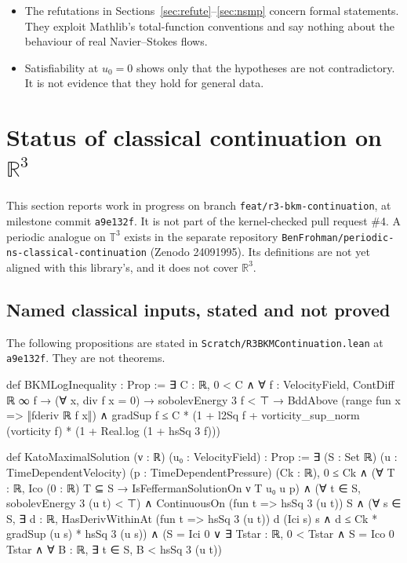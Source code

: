 \documentclass[11pt,a4paper]{article}
\theoremstyle{definition}
\theoremstyle{remark}
\newcommand{\R}{\mathbb{R}}
\newcommand{\T}{\mathbb{T}}
\newcommand{\lean}[1]{\texttt{#1}}
\begin{document}
\begin{itemize}
\item The refutations in Sections~\ref{sec:refute}--\ref{sec:nsmp} concern formal statements. They exploit Mathlib's total-function conventions and say nothing about the behaviour of real Navier--Stokes flows.
\item Satisfiability at $u_0=0$ shows only that the hypotheses are not contradictory. It is not evidence that they hold for general data.
\end{itemize}

\section[Status of classical continuation on R3]{Status of classical continuation on $\R^3$}\label{sec:continuation}

This section reports work in progress on branch \lean{feat/r3-bkm-continuation}, at milestone commit \lean{a9e132f}. It is not part of the kernel-checked pull request \#4. A periodic analogue on $\T^3$ exists in the separate repository \lean{BenFrohman/}\allowbreak\lean{periodic-ns-classical-continuation} (Zenodo 24091995). Its definitions are not yet aligned with this library's, and it does not cover $\R^3$.

\subsection{Named classical inputs, stated and not proved}
The following propositions are stated in \lean{Scratch/R3BKMContinuation.lean} at \lean{a9e132f}. They are not theorems.

\begin{leancode}
def BKMLogInequality : Prop :=
  ∃ C : ℝ, 0 < C ∧ ∀ f : VelocityField, ContDiff ℝ ∞ f → (∀ x, div f x = 0) →
    sobolevEnergy 3 f < ⊤ →
      BddAbove (range fun x => ‖fderiv ℝ f x‖) ∧
      gradSup f ≤ C * (1 + l2Sq f +
        vorticity_sup_norm (vorticity f) * (1 + Real.log (1 + hsSq 3 f)))

def KatoMaximalSolution (ν : ℝ) (u₀ : VelocityField) : Prop :=
  ∃ (S : Set ℝ) (u : TimeDependentVelocity) (p : TimeDependentPressure) (Ck : ℝ),
    0 ≤ Ck ∧
    (∀ T : ℝ, Ico (0 : ℝ) T ⊆ S → IsFeffermanSolutionOn ν T u₀ u p) ∧
    (∀ t ∈ S, sobolevEnergy 3 (u t) < ⊤) ∧
    ContinuousOn (fun t => hsSq 3 (u t)) S ∧
    (∀ s ∈ S, ∃ d : ℝ, HasDerivWithinAt (fun t => hsSq 3 (u t)) d (Ici s) s ∧
      d ≤ Ck * gradSup (u s) * hsSq 3 (u s)) ∧
    (S = Ici 0 ∨ ∃ Tstar : ℝ, 0 < Tstar ∧ S = Ico 0 Tstar ∧
      ∀ B : ℝ, ∃ t ∈ S, B < hsSq 3 (u t))
\end{leancode}
\end{document}

